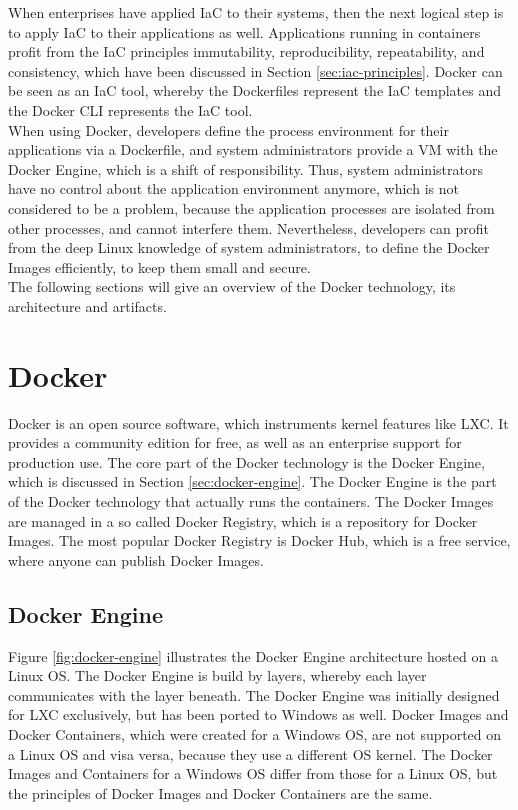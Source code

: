 When enterprises have applied IaC to their systems, then the next logical step is to apply IaC to their applications as well. Applications running in containers profit from the IaC principles immutability, reproducibility, repeatability, and consistency, which have been discussed in Section \vref{sec:iac-principles}. Docker can be seen as an IaC tool, whereby the Dockerfiles represent the IaC templates and the Docker CLI represents the IaC tool. \\

When using Docker, developers define the process environment for their applications via a Dockerfile, and system administrators provide a VM with the Docker Engine, which is a shift of responsibility. Thus, system administrators have no control about the application environment anymore, which is not considered to be a problem, because the application processes are isolated from other processes, and cannot interfere them. Nevertheless, developers can profit from the deep Linux knowledge of system administrators, to define the Docker Images efficiently, to keep them small and secure. \\

The following sections will give an overview of the Docker technology, its architecture and artifacts.  

\section{Docker}
\label{sec:docker}
Docker is an open source software, which instruments kernel features like LXC. It provides a community edition for free, as well as an enterprise support for production use. The core part of the Docker technology is the Docker Engine, which is discussed in Section \vref{sec:docker-engine}. The Docker Engine is the part of the Docker technology that actually runs the containers. The Docker Images are managed in a so called Docker Registry, which is a repository for Docker Images. The most popular Docker Registry is Docker Hub, which is a free service, where anyone can publish Docker Images\cite{DockerRegistry2018}.

\subsection{Docker Engine}
\label{sec:docker-engine}
Figure \vref{fig:docker-engine} illustrates the Docker Engine architecture hosted on a Linux OS. The Docker Engine is build by layers, whereby each layer communicates with the layer beneath. The Docker Engine was initially designed for LXC exclusively, but has been ported to Windows as well. Docker Images and Docker Containers, which were created for a Windows OS, are not supported on a Linux OS and visa versa, because they use a different OS kernel. The Docker Images and Containers for a Windows OS differ from those for a Linux OS, but the principles of Docker Images and Docker Containers are the same.
\newpage

